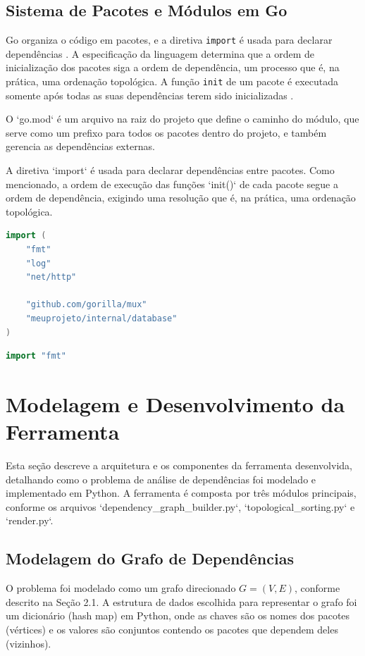 \documentclass[12pt]{article}
\begin{document}
\subsection{Sistema de Pacotes e Módulos em Go}

Go organiza o código em pacotes, e a diretiva \texttt{import} é usada para declarar dependências \cite{donovan2015go}. A especificação da linguagem determina que a ordem de inicialização dos pacotes siga a ordem de dependência, um processo que é, na prática, uma ordenação topológica. A função \texttt{init} de um pacote é executada somente após todas as suas dependências terem sido inicializadas \cite{GoSpec}.


O `go.mod` é um arquivo na raiz do projeto que define o caminho do módulo, que serve como um prefixo para todos os pacotes dentro do projeto, e também gerencia as dependências externas.

A diretiva `import` é usada para declarar dependências entre pacotes. Como mencionado, a ordem de execução das funções `init()` de cada pacote segue a ordem de dependência, exigindo uma resolução que é, na prática, uma ordenação topológica.

\begin{lstlisting}[language=Go, caption={Exemplo de um bloco de importações em Go.}, label={lst:go-imports}]
import (
    "fmt"
    "log"
    "net/http"

    "github.com/gorilla/mux"
    "meuprojeto/internal/database"
)
\end{lstlisting}

\begin{lstlisting}[language=Go, caption={Exemplo de importação inline em Go.}, label={lst:go-imports}]
import "fmt"
\end{lstlisting}

\section{Modelagem e Desenvolvimento da Ferramenta}

Esta seção descreve a arquitetura e os componentes da ferramenta desenvolvida, detalhando como o problema de análise de
dependências foi modelado e implementado em Python. A ferramenta é composta por três módulos principais, conforme os
arquivos `dependency{\_}graph{\_}builder.py`, `topological{\_}sorting.py` e `render.py`.

\subsection{Modelagem do Grafo de Dependências}
O problema foi modelado como um grafo direcionado $G = (V, E)$, conforme descrito na Seção 2.1. A estrutura de dados escolhida para representar o grafo foi um dicionário (hash map) em Python, onde as chaves são os nomes dos pacotes (vértices) e os valores são conjuntos contendo os pacotes que dependem deles (vizinhos).
\end{document}
